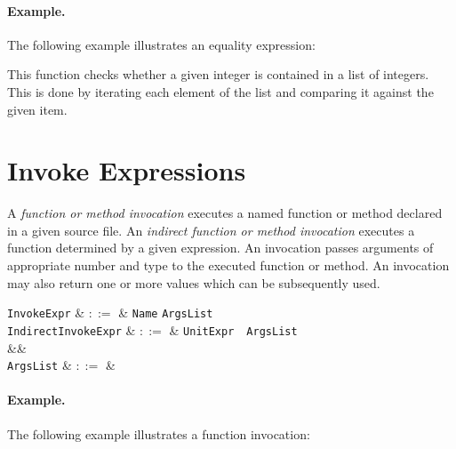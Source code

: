 \paragraph{Example.}

The following example illustrates an equality expression:



This function checks whether a given integer is contained in a list of integers.  This is done by iterating each element of the list and comparing it against the given item.


\section{Invoke Expressions}
\label{c_expr_invoke}
A {\em function or method invocation} executes a named function or method declared in a given source file.  An {\em indirect function or method invocation} executes a function determined by a given expression.  An invocation passes arguments of appropriate number and type to the executed function or method.  An invocation may also return one or more values which can be subsequently used.


\begin{syntax}
  \verb+InvokeExpr+ & $::=$ & \verb+Name+ \token{(} \verb+ArgsList+ \token{)}\\
  \verb+IndirectInvokeExpr+ & $::=$ & \verb+UnitExpr+\ \token{(}\ \verb+ArgsList+\ \token{)}\\
&&\\
\verb+ArgsList+ & $::=$ & \\
\end{syntax}

\paragraph{Example.}

The following example illustrates a function invocation:



